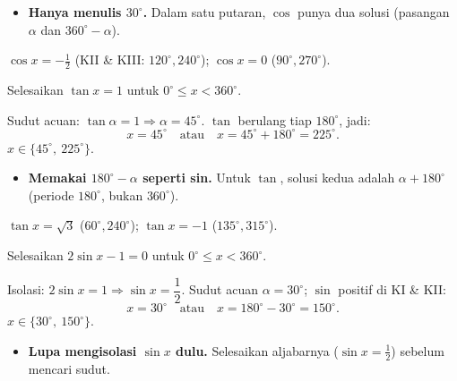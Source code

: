\begin{jebakan}
\begin{itemize}[leftmargin=*,topsep=2pt]
  \item \textbf{Hanya menulis $30^\circ$.} Dalam satu putaran, $\cos$ punya dua
  solusi (pasangan $\alpha$ dan $360^\circ-\alpha$).
\end{itemize}
\end{jebakan}

\begin{variasi}
$\cos x=-\frac12$ (KII \& KIII: $120^\circ,240^\circ$); $\cos x=0$
($90^\circ,270^\circ$).
\end{variasi}

\begin{soalbox}{}
Selesaikan $\tan x=1$ untuk $0^\circ\le x<360^\circ$.
\end{soalbox}

\jawab
{} Sudut acuan: $\tan\alpha=1\Rightarrow\alpha=45^\circ$.
 $\tan$ berulang tiap $180^\circ$, jadi:
\[
x=45^\circ \quad\text{atau}\quad x=45^\circ+180^\circ=225^\circ.
\]
\jadi $x\in\{45^\circ,\ 225^\circ\}$.

\begin{jebakan}
\begin{itemize}[leftmargin=*,topsep=2pt]
  \item \textbf{Memakai $180^\circ-\alpha$ seperti sin.} Untuk $\tan$, solusi
  kedua adalah $\alpha+180^\circ$ (periode $180^\circ$, bukan $360^\circ$).
\end{itemize}
\end{jebakan}

\begin{variasi}
$\tan x=\sqrt3$ ($60^\circ,240^\circ$); $\tan x=-1$ ($135^\circ,315^\circ$).
\end{variasi}

\begin{soalbox}{}
Selesaikan $2\sin x-1=0$ untuk $0^\circ\le x<360^\circ$.
\end{soalbox}

\jawab
{} Isolasi: $2\sin x=1\Rightarrow\sin x=\dfrac12$.
 Sudut acuan $\alpha=30^\circ$; $\sin$ positif di KI \& KII:
\[
x=30^\circ \quad\text{atau}\quad x=180^\circ-30^\circ=150^\circ.
\]
\jadi $x\in\{30^\circ,\ 150^\circ\}$.

\begin{jebakan}
\begin{itemize}[leftmargin=*,topsep=2pt]
  \item \textbf{Lupa mengisolasi $\sin x$ dulu.} Selesaikan aljabarnya
  ($\sin x=\frac12$) sebelum mencari sudut.
\end{itemize}
\end{jebakan}

